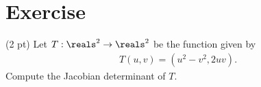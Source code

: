 \section{Exercise}

(2 pt) Let $T: \reals^{2} \rightarrow \reals^{2}$ be the function given by
\begin{align*}
T(u,v)
=
\left(u^{2} - v^{2},2 u v\right).
\end{align*}
Compute the Jacobian determinant of $T$.

\spaceSolution{2.5in}{%
}%